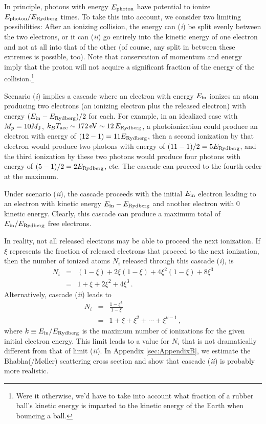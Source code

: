 \documentclass[iop,numberedappendix,apj]{emulateapj}
\begin{document}
In principle, photons with energy $E_{\rm photon}$ have potential to ionize $E_{\rm photon}/E_{\rm Rydberg}$ times.
To take this into account, we consider two limiting possibilities:
After an ionizing collision, the energy can (\emph{i}) be split evenly between the two electrons, or it can (\emph{ii}) go entirely into the kinetic energy of one electron and not at all into that of the other (of course, any split in between these extremes is possible, too).
Note that conservation of momentum and energy imply that the proton will not acquire a significant fraction of the energy of the collision.\footnote{Were it otherwise, we'd have to take into account what fraction of a rubber ball's kinetic energy is imparted to the kinetic energy of the Earth when bouncing a ball.}  

Scenario (\emph{i}) implies a cascade where an electron with energy $E_{\rm in}$ ionizes an atom producing two electrons (an ionizing electron plus the released electron) with energy $ ( E_{\rm in} - E_{\rm Rydberg} ) /2 $ for each.
For example, in an idealized case with $M_p = 10 M_{\rm J}$, $k_B T_{\rm acc} \sim 172\,{\rm eV} \sim 12 \, E_{\rm Rydberg}$, a photoionization could produce an electron with energy of $(12-1) = 11 E_{\rm Rydberg} $, then a second ionization by that electron would produce two photons with energy of $(11-1)/2 = 5 E_{\rm Rydberg}$, and the third ionization by these two photons would produce four photons with energy of $(5-1)/2 = 2 E_{\rm Rydberg}$, etc.
The cascade can proceed to the fourth order at the maximum.

Under scenario (\emph{ii}), the cascade proceeds with the initial $E_{\rm in}$ electron leading to an electron with kinetic energy $E_{\rm in} - E_{\rm Rydberg}$ and another electron with 0 kinetic energy.
Clearly, this cascade can produce a maximum total of $E_{\rm in} / E_{\rm Rydberg}$ free electrons.

In reality, not all released electrons may be able to proceed the next ionization.
If $\xi$ represents the fraction of released electrons that proceed to the next ionization, then the number of ionized atoms $N_i$ released through this cascade (\emph{i}), is
\begin{eqnarray}
  \nonumber N_i & = & (1-\xi) + 2\xi (1-\xi) + 4 \xi^2 (1-\xi) + 8 \xi^3 \\
  \label{eq:N_i1} & = & 1 + \xi + 2 \xi^2 + 4 \xi ^3 \, .
\end{eqnarray}
Alternatively, cascade (\emph{ii}) leads to
\begin{eqnarray}
  \nonumber N_i & = & \frac{1 - \xi^k}{1 - \xi} \\
  \label{eq:N_i2}  & = & 1 + \xi + \xi^2 + \cdots + \xi^{\nu - 1} \, ,
\end{eqnarray}
where $k \equiv E_{\rm in} / E_{\rm Rydberg}$ is the maximum number of ionizations for the given initial electron energy.
This limit leads to a value for $N_i$ that is not dramatically different from that of limit (\emph{ii}).
In Appendix \ref{sec:AppendixB}, we estimate the Bhabha(/M{\o}ller) scattering cross section and show that cascade (\emph{ii}) is probably more realistic.
\end{document}

